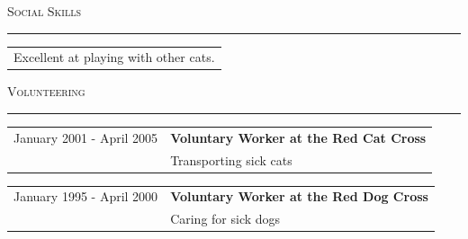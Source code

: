 \documentclass[
	fontsize = 10.0pt,
	a4paper,
	parskip = half*,
	twoside,	%
]{scrartcl}
\newcommand{\hlinewidth}{0.5mm}
\newcommand{\hlinelength}{150mm}
\newcommand{\hlinecolor}{black!25}
\newcommand{\hlinevskip}{-4.0mm}
\newcommand{\vskipEntries}{-5.0mm}
\newcommand{\hskipFirstColumn}{5.0cm}
\begin{document}
	{\fontsize{20pt}{17pt}\selectfont\scshape Social Skills}
	\vskip \hlinevskip%
	\textcolor{\hlinecolor}{\rule{\hlinelength}{\hlinewidth}}

	\begin{table}[H]
		\begin{tabular}{ l}
			Excellent at playing with other cats.
		\end{tabular}
	\end{table}%

	\pagebreak	%

	{\fontsize{20pt}{17pt}\selectfont\scshape Volunteering}
	\vskip \hlinevskip%
	\textcolor{\hlinecolor}{\rule{\hlinelength}{\hlinewidth}}

	\begin{table}[H]
		\begin{tabular}{ p{\hskipFirstColumn} l }		%
			January 2001 - April 2005		&	{\fontsize{10pt}{10pt}\selectfont\bfseries Voluntary Worker at the Red Cat Cross}	\\
											&	Transporting sick cats																\\
		\end{tabular}
	\end{table}%

	\vspace{\vskipEntries}

	\begin{table}[H]
		\begin{tabular}{ p{\hskipFirstColumn} l }		%
			January 1995 - April 2000		&	{\fontsize{10pt}{10pt}\selectfont\bfseries Voluntary Worker at the Red Dog Cross}	\\
											&	Caring for sick dogs																\\
		\end{tabular}
	\end{table}%
\end{document}
